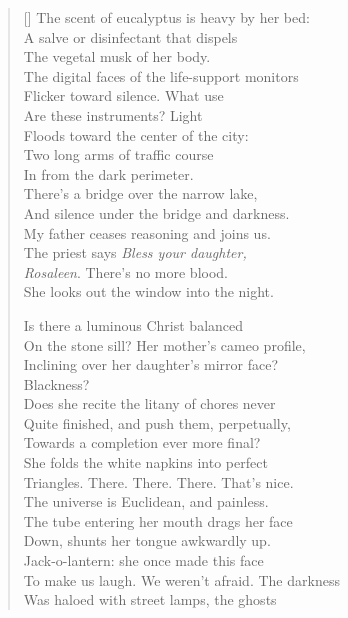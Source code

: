 \begin{verse}[\versewidth]
The scent of eucalyptus is heavy by her bed:\\
A salve or disinfectant that dispels\\
The vegetal musk of her body.\\
The digital faces of the life-support monitors\\
Flicker toward silence. What use\\
Are these instruments? Light\\
Floods toward the center of the city:\\
Two long arms of traffic course\\
In from the dark perimeter.\\
There's a bridge over the narrow lake,\\
And silence under the bridge and darkness.\\
My father ceases reasoning and joins us.\\
The priest says \textit{Bless your daughter,}\\
\textit{Rosaleen}. There's no more blood.\\
She looks out the window into the night.

Is there a luminous Christ balanced\\
On the stone sill? Her mother's cameo profile,\\
Inclining over her daughter's mirror face?\\
Blackness?\\
Does she recite the litany of chores never\\
Quite finished, and push them, perpetually,\\
Towards a completion ever more final?\\
She folds the white napkins into perfect\\
Triangles. There. There. There. That's nice.\\
The universe is Euclidean, and painless.\\
The tube entering her mouth drags her face\\
Down, shunts her tongue awkwardly up.\\
Jack-o-lantern: she once made this face\\
To make us laugh. We weren't afraid. The darkness\\
Was haloed with street lamps, the ghosts


\end{verse}
